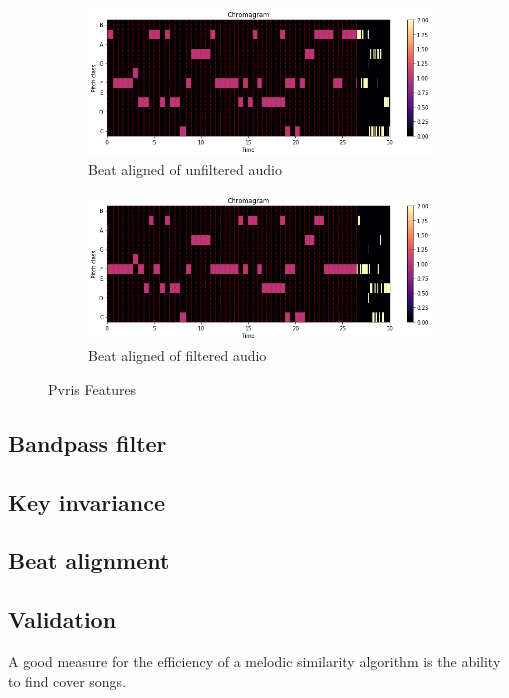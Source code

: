 \begin{figure}[htbp]
{{			\begin{subfigure}{.495\textwidth}
				\centering    
				\includegraphics[scale=0.3]{Images/Chroma/pvrisunfiltered.png}
				\caption{Beat aligned of unfiltered audio}
				\label{pvub}
			\end{subfigure}		
			\begin{subfigure}{.495\textwidth}
				\centering     
				\includegraphics[scale=0.3]{Images/Chroma/pvrisfiltered.png}
				\caption{Beat aligned of filtered audio}
				\label{pvfb}
			\end{subfigure}%
	}}
	\caption{Pvris Features}
	\label{fig:pvris1}
\end{figure}

\subsection{Bandpass filter}

\subsection{Key invariance}



\subsection{Beat alignment}



\subsection{Validation}

A good measure for the efficiency of a melodic similarity algorithm is the ability to find cover songs. 



